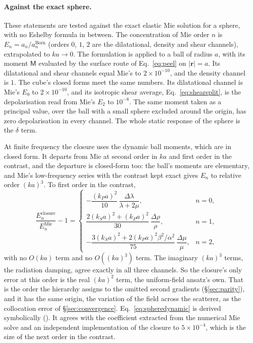 \documentclass[extra,mreferee]{gji}
\begin{document}
\paragraph{Against the exact sphere.} These statements are tested against the exact elastic Mie
solution for a sphere, with no Eshelby formula in between. The concentration of Mie order $n$ is
$E_n=a_n/a_n^{\text{Born}}$ (orders $0$, $1$, $2$ are the dilatational, density and shear
channels), extrapolated to $ka\to0$. The formulation is applied to a ball of radius $a$, with its moment
$\mathsf M$ evaluated by the surface route of Eq.~\eqref{eq:peel} on $|\mathbf r|=a$. Its
dilatational and shear channels equal Mie's to $2\times10^{-10}$, and the density channel is
$1$. The cube's closed forms meet the same numbers. Its dilatational channel is Mie's
$E_0$ to $2\times10^{-10}$, and its isotropic shear average, Eq.~\eqref{eq:shearsplit}, is the
depolarisation read from Mie's $E_2$ to $10^{-8}$. The same moment taken as a principal value, over
the ball with a small sphere excluded around the origin, has zero depolarisation in every
channel. The whole static response of the sphere is the $\delta$ term.

At finite frequency the closure uses the dynamic ball moments, which are in closed form. It
departs from Mie at second order in $ka$ and first order in the contrast, and the departure is
closed-form too: the ball's moments are elementary, and Mie's low-frequency series with the
contrast kept exact gives $E_n$ to relative order $(ka)^3$. To first order in the contrast,
\begin{equation}\label{eq:spheredynamic}
\frac{E_n^{\text{closure}}}{E_n^{\text{Mie}}}-1=
\begin{cases}
  -\dfrac{(k_Pa)^2}{10}\,\dfrac{\Delta\lambda}{\lambda+2\mu}, & n=0,\\[8pt]
  \dfrac{2(k_Sa)^2+(k_Pa)^2}{30}\,\dfrac{\Delta\rho}{\rho}, & n=1,\\[8pt]
  -\dfrac{3(k_Sa)^2+2(k_Pa)^2\beta^2/\alpha^2}{75}\,\dfrac{\Delta\mu}{\mu}, & n=2,
\end{cases}
\end{equation}
with no $O(ka)$ term and no $O((ka)^3)$ term. The imaginary $(ka)^3$ terms, the radiation damping,
agree exactly in all three channels. So the closure's only error at this order is the real
$(ka)^2$ term, the uniform-field ansatz's own. That is the order the hierarchy assigns to the
omitted second gradients (\S\ref{sec:parity}), and it has the same origin, the variation of the
field across the scatterer, as the collocation error of \S\ref{sec:convergence}. Eq.~\eqref{eq:spheredynamic} is derived symbolically
(). It agrees with the coefficient extracted from the numerical Mie
solve and an independent implementation of the closure to $5\times10^{-4}$, which is the size of the
next order in the contrast.
\end{document}
